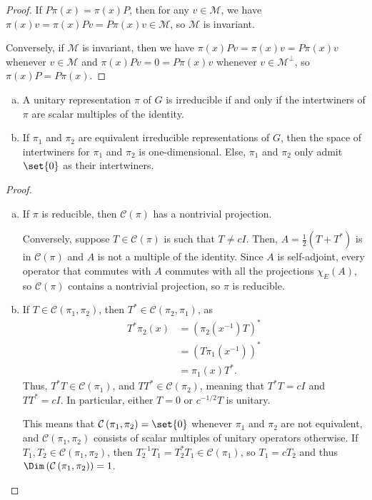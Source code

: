 \documentclass[12pt]{mypackage}
\begin{document}
\begin{proof}
  If $P\pi(x) = \pi(x)P$, then for any $v\in \mathcal{M}$, we have $\pi(x)v = \pi(x)Pv = P\pi(x)v\in \mathcal{M}$, so $\mathcal{M}$ is invariant.

  Conversely, if $\mathcal{M}$ is invariant, then we have $\pi(x)Pv = \pi(x)v = P\pi(x)v$ whenever $v\in \mathcal{M}$ and $\pi(x)Pv = 0 = P\pi(x)v$ whenever $v\in \mathcal{M}^{\perp}$, so $\pi(x)P = P\pi(x)$.
\end{proof}
\begin{theorem}\hfill
  \begin{enumerate}[(a)]
    \item A unitary representation $\pi$ of $G$ is irreducible if and only if the intertwiners of $\pi$ are scalar multiples of the identity.
    \item If $\pi_1$ and $\pi_2$ are equivalent irreducible representations of $G$, then the space of intertwiners for $\pi_1$ and $\pi_2$ is one-dimensional. Else, $\pi_1$ and $\pi_2$ only admit $\set{0}$ as their intertwiners.
  \end{enumerate}
\end{theorem}
\begin{proof}\hfill
  \begin{enumerate}[(a)]
    \item If $\pi$ is reducible, then $\mathcal{C}(\pi)$ has a nontrivial projection.

      Conversely, suppose $T\in \mathcal{C}(\pi)$ is such that $T\neq cI$. Then, $A = \frac{1}{2}\left( T + T^{\ast} \right)$ is in $\mathcal{C}(\pi)$ and $A$ is not a multiple of the identity. Since $A$ is self-adjoint, every operator that commutes with $A$ commutes with all the projections $\chi_E(A)$, so $\mathcal{C}(\pi)$ contains a nontrivial projection, so $\pi$ is reducible.
    \item If $T\in \mathcal{C}\left( \pi_1,\pi_2 \right)$, then $T^{\ast}\in \mathcal{C}\left( \pi_2,\pi_1 \right)$, as
      \begin{align*}
        T^{\ast}\pi_2\left( x \right) &= \left( \pi_2\left( x^{-1} \right)T \right)^{\ast}\\
                                      &= \left( T\pi_1\left( x^{-1} \right) \right)^{\ast}\\
                                      &= \pi_1(x)T^{\ast}.
      \end{align*}
      Thus, $T^{\ast}T\in \mathcal{C}\left( \pi_1 \right)$, and $TT^{\ast}\in \mathcal{C}\left( \pi_2 \right)$, meaning that $T^{\ast}T = cI$ and $TT^{\ast} = cI$. In particular, either $T = 0$ or $c^{-1/2}T$ is unitary.

      This means that $\mathcal{C}\left( \pi_1,\pi_2 \right) = \set{0}$ whenever $\pi_1$ and $\pi_2$ are not equivalent, and $\mathcal{C}\left( \pi_1,\pi_2 \right)$ consists of scalar multiples of unitary operators otherwise. If $T_1,T_2\in \mathcal{C}\left( \pi_1,\pi_2 \right)$, then $T_2^{-1}T_1 = T_2^{\ast}T_1\in \mathcal{C}\left( \pi_1 \right)$, so $T_1 = cT_2$ and thus $\Dim\left( \mathcal{C}\left( \pi_1,\pi_2 \right) \right) = 1$.
  \end{enumerate}
\end{proof}
\end{document}
